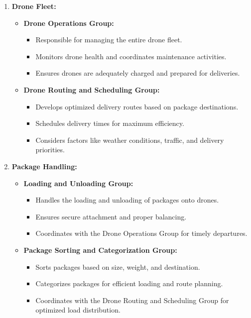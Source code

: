 \documentclass[preprint,12pt]{elsarticle}
\begin{document}
\begin{enumerate}
\item \textbf{Drone Fleet:}
\begin{itemize}
  \item \textbf{Drone Operations Group:}
    \begin{itemize}
      \item Responsible for managing the entire drone fleet.
      \item Monitors drone health and coordinates maintenance activities.
      \item Ensures drones are adequately charged and prepared for deliveries.
    \end{itemize}
  \item \textbf{Drone Routing and Scheduling Group:}
    \begin{itemize}
      \item Develops optimized delivery routes based on package destinations.
      \item Schedules delivery times for maximum efficiency.
      \item Considers factors like weather conditions, traffic, and delivery priorities.
    \end{itemize}
\end{itemize}

\item \textbf{Package Handling:}
\begin{itemize}
  \item \textbf{Loading and Unloading Group:}
    \begin{itemize}
      \item Handles the loading and unloading of packages onto drones.
      \item Ensures secure attachment and proper balancing.
      \item Coordinates with the Drone Operations Group for timely departures.
    \end{itemize}
  \item \textbf{Package Sorting and Categorization Group:}
    \begin{itemize}
      \item Sorts packages based on size, weight, and destination.
      \item Categorizes packages for efficient loading and route planning.
      \item Coordinates with the Drone Routing and Scheduling Group for optimized load distribution.
    \end{itemize}
\end{itemize}


\end{enumerate}
\end{document}
